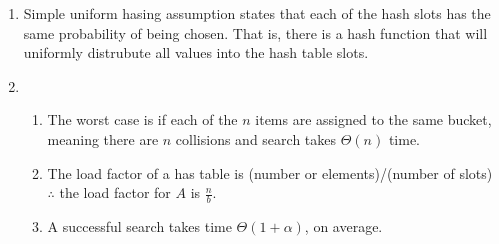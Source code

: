 \documentclass[9pt]{article}
\begin{document}
\begin{enumerate}
	\item Simple uniform hasing assumption states that each of the hash slots has the same probability of being chosen. That is, there is a hash function that will uniformly distrubute all values into the hash table slots.
	\item \phantom{.}
		\begin{enumerate}
			\item The worst case is if each of the $n$ items are assigned to the same bucket, meaning there are $n$ collisions and search takes $\Theta(n)$ time.
			\item The load factor of a has table is (number or elements)/(number of slots) $\therefore$  the load factor for $A$ is $\frac{n}{b}$.
			\item A successful search takes time $\Theta(1+\alpha)$, on average.
		\end{enumerate}
	\end{enumerate}

\newpage



\vspace{5mm}
\end{document}
